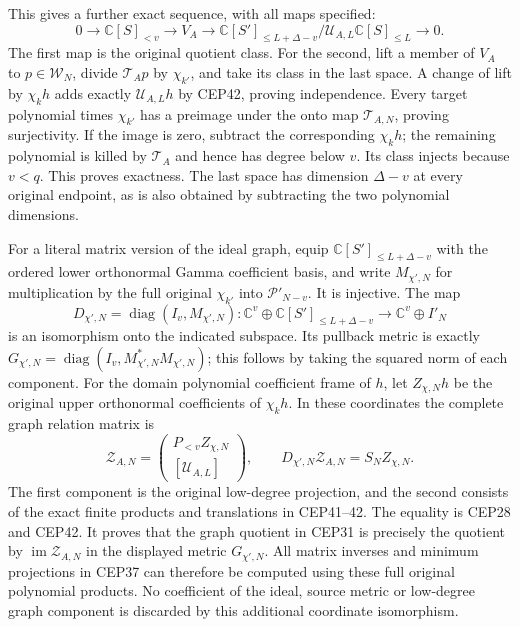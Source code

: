 \documentclass[11pt,a4paper]{article}
\begin{document}
This gives a further exact sequence, with all maps specified:
\[
 0\longrightarrow\mathbb C[S]_{<v}
 \longrightarrow V_A
 \longrightarrow
 \mathbb C[S']_{\le L+\Delta-v}/
                     \mathcal U_{A,L}\mathbb C[S]_{\le L}
 \longrightarrow0 .
 \tag{CEP43}
\]
The first map is the original quotient class. For the second,
lift a member of $V_A$ to $p\in\mathcal W_N$, divide
$\mathcal T_Ap$ by $\chi_{k'}$, and take its class in the last
space. A change of lift by $\chi_kh$ adds exactly
$\mathcal U_{A,L}h$ by CEP42, proving independence. Every target
polynomial times $\chi_{k'}$ has a preimage under the onto
map $\mathcal T_{A,N}$, proving surjectivity. If the image is
zero, subtract the corresponding $\chi_kh$; the remaining
polynomial is killed by $\mathcal T_A$ and hence has degree
below $v$. Its class injects because $v<q$.
This proves exactness. The last space has dimension $\Delta-v$
at every original endpoint, as is also obtained by subtracting
the two polynomial dimensions.

For a literal matrix version of the ideal graph, equip
$\mathbb C[S']_{\le L+\Delta-v}$ with the ordered lower
orthonormal Gamma coefficient basis, and write $M_{\chi',N}$
for multiplication by the full original $\chi_{k'}$ into
$\mathcal P'_{N-v}$. It is injective. The map
\[
 D_{\chi',N}=\operatorname{diag}(I_v,M_{\chi',N})
 :\mathbb C^v\oplus\mathbb C[S']_{\le L+\Delta-v}
       \longrightarrow\mathbb C^v\oplus I'_N
 \tag{CEP44}
\]
is an isomorphism onto the indicated subspace. Its pullback metric
is exactly
$G_{\chi',N}=\operatorname{diag}(I_v,M_{\chi',N}^*M_{\chi',N})$;
this follows by taking the squared norm of each component.
For the domain polynomial coefficient frame of $h$, let
$Z_{\chi,N}h$ be the original upper orthonormal coefficients
of $\chi_kh$. In these coordinates the complete graph relation
matrix is
\[
 \mathcal Z_{A,N}=
 \begin{pmatrix}
 P_{<v}Z_{\chi,N}\\[2pt]
 [\mathcal U_{A,L}]
 \end{pmatrix},\qquad
 D_{\chi',N}\mathcal Z_{A,N}=S_N Z_{\chi,N}.
 \tag{CEP45}
\]
The first component is the original low-degree projection,
and the second consists of the exact finite products and
translations in CEP41--42. The equality is CEP28 and CEP42.
It proves that the graph quotient in CEP31 is precisely the
quotient by $\operatorname{im}\mathcal Z_{A,N}$ in the
displayed metric $G_{\chi',N}$. All matrix inverses and
minimum projections in CEP37 can therefore be computed using
these full original polynomial products. No coefficient of
the ideal, source metric or low-degree graph component is
discarded by this additional coordinate isomorphism.
\end{document}

